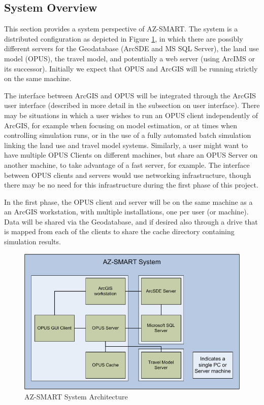 \subsection{System Overview}
This section provides a system perspective of AZ-SMART.  The system is a distributed configuration as depicted in Figure \ref{figSystem}, in which there are possibly different servers for the Geodatabase (ArcSDE and MS SQL Server), the land use model (OPUS), the travel model, and potentially a web server (using ArcIMS or its successor).  Initially we expect that OPUS and ArcGIS will be running strictly on the same machine. 

The interface between ArcGIS and OPUS will be integrated through the ArcGIS user interface (described in more detail in the subsection on user interface).  There may be situations in which a user wishes to run an OPUS client independently of ArcGIS, for example when focusing on model estimation, or at times when controlling simulation runs, or in the use of a fully automated batch simulation linking the land use and travel model systems.  Similarly, a user might want to have multiple OPUS Clients on different machines, but share an OPUS Server on another machine, to take advantage of a fast server, for example.  The interface between OPUS clients and servers would use networking infrastructure, though there may be no need for this infrastructure during the first phase of this project.  

In the first phase, the OPUS client and server will be on the same machine as a an ArcGIS workstation, with multiple installations, one per user (or machine).  Data will be shared via the Geodatabase, and if desired also through a drive that is mapped from each of the clients to share the cache directory containing simulation results.

\begin{figure}[h]
\begin{center}
\includegraphics[scale=0.6]{figures/AZ-SMART_system_diagram.png}
\caption{AZ-SMART System Architecture}
\label{figSystem}
\end{center}
\end{figure}

